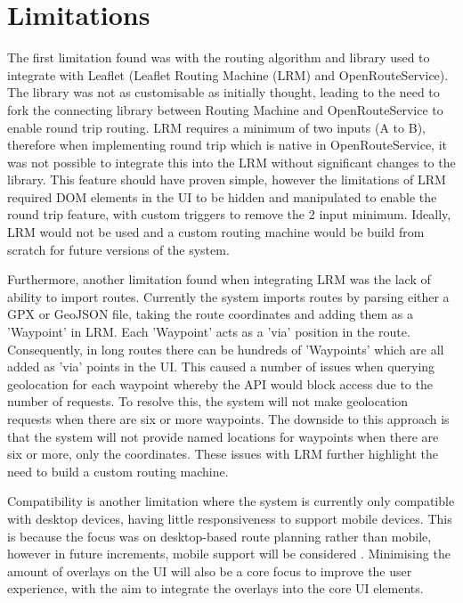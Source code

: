 \clearpage
\section{Limitations}
\label{evaluation:limitations}

The first limitation found was with the routing algorithm and library used to integrate with Leaflet (Leaflet Routing Machine (LRM) and OpenRouteService). The library was not as customisable as initially thought, leading to the need to fork the connecting library between Routing Machine and OpenRouteService to enable round trip routing. LRM requires a minimum of two inputs (A to B), therefore when implementing round trip which is native in OpenRouteService, it was not possible to integrate this into the LRM without significant changes to the library. This feature should have proven simple, however the limitations of LRM required DOM elements in the UI to be hidden and manipulated to enable the round trip feature, with custom triggers to remove the 2 input minimum. Ideally, LRM would not be used and a custom routing machine would be build from scratch for future versions of the system.

Furthermore, another limitation found when integrating LRM was the lack of ability to import routes. Currently the system imports routes by parsing either a GPX or GeoJSON file, taking the route coordinates and adding them as a 'Waypoint' in LRM. Each 'Waypoint' acts as a 'via' position in the route. Consequently, in long routes there can be hundreds of 'Waypoints' which are all added as 'via' points in the UI. This caused a number of issues when querying geolocation for each waypoint whereby the API would block access due to the number of requests. To resolve this, the system will not make geolocation requests when there are six or more waypoints. The downside to this approach is that the system will not provide named locations for waypoints when there are six or more, only the coordinates. These issues with LRM further highlight the need to build a custom routing machine.

Compatibility is another limitation where the system is currently only compatible with desktop devices, having little responsiveness to support mobile devices. This is because the focus was on desktop-based route planning rather than mobile, however in future increments, mobile support will be considered . Minimising the amount of overlays on the UI will also be a core focus to improve the user experience, with the aim to integrate the overlays into the core UI elements.

